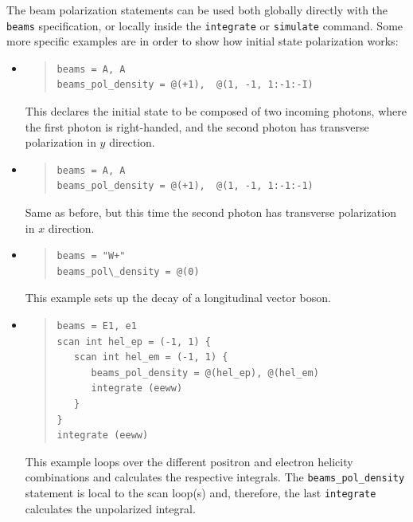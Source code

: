 \documentclass[12pt]{book}
\newcommand{\ttt}[1]{\texttt{#1}}
\begin{document}
The beam polarization statements can be used both globally directly
with the \ttt{beams} specification, or locally inside the
\ttt{integrate} or \ttt{simulate} command. Some more specific examples
are in order to show how initial state polarization works:
%
\begin{itemize}
\item
\begin{quote}
\begin{footnotesize}
\begin{verbatim}
beams = A, A
beams_pol_density = @(+1),  @(1, -1, 1:-1:-I)
\end{verbatim}
\end{footnotesize}
\end{quote}
This declares the initial state to be composed of two incoming
photons, where the first photon is right-handed, and the second photon
has transverse polarization in $y$ direction.
%
\item
\begin{quote}
\begin{footnotesize}
\begin{verbatim}
beams = A, A
beams_pol_density = @(+1),  @(1, -1, 1:-1:-1)
\end{verbatim}
\end{footnotesize}
\end{quote}
Same as before, but this time the second photon has transverse
polarization in $x$ direction.

%
\item
\begin{quote}
\begin{footnotesize}
\begin{verbatim}
beams = "W+"
beams_pol\_density = @(0)
\end{verbatim}
\end{footnotesize}
\end{quote}
This example sets up the decay of a longitudinal vector boson.
%
\item
\begin{quote}
\begin{footnotesize}
\begin{verbatim}
beams = E1, e1
scan int hel_ep = (-1, 1) {
   scan int hel_em = (-1, 1) {
      beams_pol_density = @(hel_ep), @(hel_em)
      integrate (eeww)
   }
}
integrate (eeww)
\end{verbatim}
\end{footnotesize}
\end{quote}
This example loops over the different positron and electron helicity
combinations and calculates the respective integrals. The
\ttt{beams\_pol\_density} statement is local to the scan loop(s) and,
therefore, the last \ttt{integrate} calculates the unpolarized
integral.
\end{itemize}
%
\end{document}
